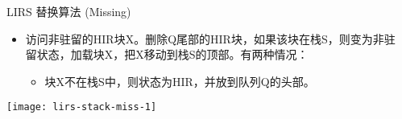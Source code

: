 \begin{frame}[plain]
	\frametitle{ }
	\begin{columns}
		\begin{column}{.1\textwidth}
			\centering
			
			
		\end{column}
		
		\begin{column}{.9\textwidth}
			LIRS 替换算法 (Missing)
			
			\begin{itemize}
				
				\item 访问非驻留的HIR块X。删除Q尾部的HIR块，如果该块在栈S，则变为非驻留状态，加载块X，把X移动到栈S的顶部。有两种情况：
				\begin{itemize}
					\item 块X不在栈S中，则状态为HIR，并放到队列Q的头部。
				
				
			\end{itemize}
			\end{itemize}
			\centering
			\texttt{[image: lirs-stack-miss-1]}
			
		\end{column}
		
		
	\end{columns}
\end{frame}


